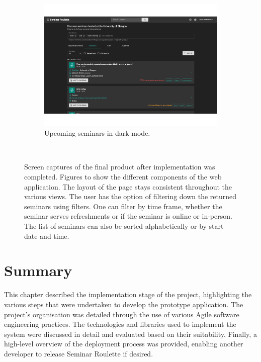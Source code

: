 \documentclass{l4proj}
\begin{document}
\begin{figure}[htb]
\begin{subfigure}[b]{0.49\textwidth}
    \end{subfigure}
    ~
    \begin{subfigure}[b]{0.49\textwidth}
        \includegraphics[width=\textwidth]{images/final_dark_mode.pdf}
        \caption{Upcoming seminars in dark mode.}
        \label{fig:final_dark_mode}
    \end{subfigure}
    ~
    \caption{Screen captures of the final product after implementation was completed. Figures  to  show the different components of the web application. The layout of the page stays consistent throughout the various views. The user has the option of filtering down the returned seminars using filters. One can filter by time frame, whether the seminar serves refreshments or if the seminar is online or in-person. The list of seminars can also be sorted alphabetically or by start date and time.}
    \label{fig:final_product}
\end{figure}

\section{Summary}

This chapter described the implementation stage of the project, highlighting the various steps that were undertaken to develop the prototype application. The project's organisation was detailed through the use of various Agile software engineering practices. The technologies and libraries used to implement the system were discussed in detail and evaluated based on their suitability. Finally, a high-level overview of the deployment process was provided, enabling another developer to release Seminar Roulette if desired.
\end{document}
